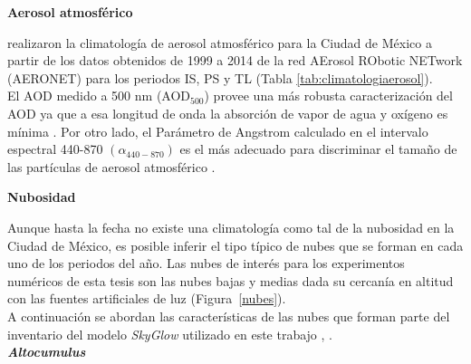\textbf{Aerosol atmosférico}

\cite{Carabali2017} realizaron la climatología de aerosol atmosférico para la Ciudad de México a partir de los datos obtenidos de 1999 a 2014 de la red AErosol RObotic NETwork (AERONET) para los periodos IS, PS y TL  (Tabla \ref{tab:climatologiaerosol}).\\

El AOD medido a 500 nm (AOD$_{500}$) provee una más robusta caracterización del AOD ya que a esa longitud de onda la absorción de vapor de agua y oxígeno es mínima \citep{Kanniah2009}. Por otro lado, el Parámetro de Angstrom calculado en el intervalo espectral 440-870 $(\alpha_{440-870})$ es el más adecuado para discriminar el tamaño de las partículas de aerosol atmosférico \citep{Kaskaoutis2007}.

\begin{table}[htb]
\centering
\caption{Climatología de aerosol atmosférico en la Ciudad de México \citep{Carabali2017}}
\label{tab:climatologiaerosol}
\end{table}

\newpage

\textbf{Nubosidad}

Aunque hasta la fecha no existe una climatología como tal de la nubosidad en la Ciudad de México, es posible inferir el tipo típico de nubes que se forman en cada uno de los periodos del año. Las nubes de interés para los experimentos numéricos de esta tesis son las nubes bajas y medias dada su cercanía en altitud con las fuentes artificiales de luz (Figura~\ref{nubes}).\\

A continuación se abordan las características de las nubes que forman parte del inventario del modelo \textit{SkyGlow} utilizado en este trabajo \citep{Cloudatlas1987}, \citep{Solano2015}.\\

\textit{\textbf{Altocumulus}}

